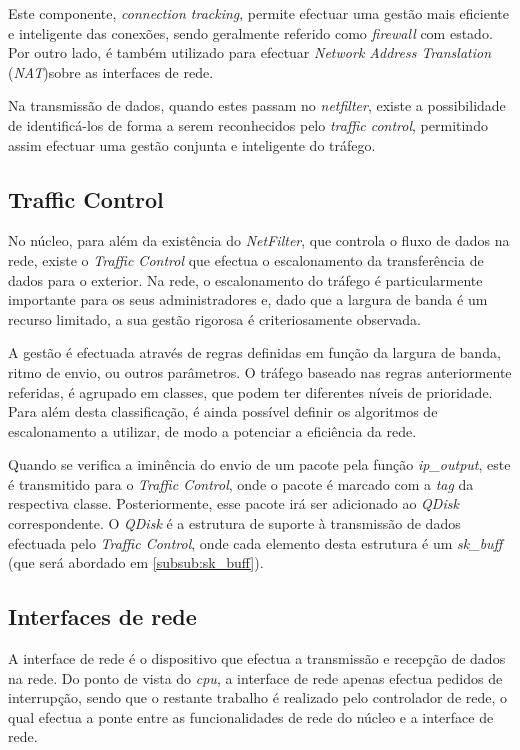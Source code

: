 Este componente, \textit{connection tracking}, permite efectuar uma gestão mais eficiente e inteligente das conexões, sendo geralmente referido como \textit{firewall} com estado.
Por outro lado, é também utilizado para efectuar \textit{Network Address Translation} (\textit{NAT})sobre as interfaces de rede.

Na transmissão de dados, quando estes passam no \textit{netfilter}, existe a possibilidade de identificá-los de forma a serem reconhecidos pelo \textit{traffic control}, permitindo assim efectuar uma gestão conjunta e inteligente do tráfego.

\subsection{Traffic Control}
\label{sub:traffic_control}

No núcleo, para além da existência do \textit{NetFilter}, que controla o fluxo de dados na rede, existe o \textit{Traffic Control} que efectua o escalonamento da transferência de dados para o exterior.
Na rede, o escalonamento do tráfego é particularmente importante para os seus administradores e, dado que a largura de banda é um recurso limitado, a sua gestão rigorosa é criteriosamente observada.

A gestão é efectuada através de regras definidas em função da largura de banda, ritmo de envio, ou outros parâmetros.
O tráfego baseado nas regras anteriormente referidas, é agrupado em classes, que podem ter diferentes níveis de prioridade.
Para além desta classificação, é ainda possível definir os algoritmos de escalonamento a utilizar, de modo a potenciar a eficiência da rede.

Quando se verifica a iminência do envio de um pacote pela função \textit{ip\_output}, este é transmitido para o \textit{Traffic Control}, onde o pacote é marcado com a \textit{tag} da respectiva classe.
Posteriormente, esse pacote irá ser adicionado ao \textit{QDisk} correspondente.
O \textit{QDisk} é a estrutura de suporte à transmissão de dados efectuada pelo \textit{Traffic Control}, onde cada elemento desta estrutura é um \textit{sk\_buff} (que será abordado em \ref{subsub:sk_buff}).


\subsection{Interfaces de rede}

A interface de rede é o dispositivo que efectua a transmissão e recepção de dados na rede.
Do ponto de vista do \textit{cpu}, a interface de rede apenas efectua pedidos de interrupção, sendo que o restante trabalho é realizado pelo controlador de rede, o qual efectua a ponte entre as funcionalidades de rede do núcleo e a interface de rede.

